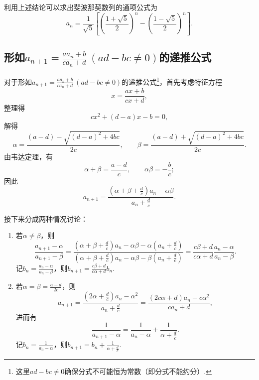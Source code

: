 利用上述结论可以求出斐波那契数列的通项公式为\[
a_n = \frac{1}{\sqrt{5}} \left[
\left(\frac{1+\sqrt{5}}{2}\right)^n
-\left(\frac{1-\sqrt{5}}{2}\right)^n
\right].
\]

\subsection{\texorpdfstring{形如\(a_{n+1} = \frac{a a_n + b}{c a_n + d}\ (ad-bc\neq0)\)的递推公式}{第二类递推公式}}
对于形如\(a_{n+1} = \frac{a a_n + b}{c a_n + d}\ (ad-bc\neq0)\)的递推公式\footnote{这里\(ad-bc\neq0\)确保分式不可能恒为常数（即分式不能约分）.}，首先考虑特征方程\[
x = \frac{ax+b}{cx+d},
\]整理得\[
cx^2+(d-a)x-b=0,
\]解得\[
\alpha=\frac{(a-d)-\sqrt{(d-a)^2+4bc}}{2c}, \qquad
\beta=\frac{(a-d)+\sqrt{(d-a)^2+4bc}}{2c}.
\]由韦达定理，有\[
\alpha+\beta=\frac{a-d}{c}, \qquad
\alpha\beta=-\frac{b}{c};
\]因此\[
a_{n+1} = \frac{\left(\alpha+\beta+\frac{d}{c}\right) a_n - \alpha\beta}{a_n + \frac{d}{c}}.
\]

接下来分成两种情况讨论：\begin{enumerate}
\item 若\(\alpha\neq\beta\)，则\[
\frac{a_{n+1}-\alpha}{a_{n+1}-\beta}
= \frac{\left(\alpha+\beta+\frac{d}{c}\right) a_n - \alpha\beta - \alpha \left(a_n + \frac{d}{c}\right)}{\left(\alpha+\beta+\frac{d}{c}\right) a_n - \alpha\beta - \beta \left(a_n + \frac{d}{c}\right)}
= \frac{c\beta+d}{c\alpha+d} \frac{a_n-\alpha}{a_n-\beta}.
\]记\(b_n = \frac{a_n-\alpha}{a_n-\beta}\)，则\(b_{n+1} = \frac{c\beta+d}{c\alpha+d} b_n\).

\item 若\(\alpha=\beta=\frac{a-d}{2c}\)，则\[
a_{n+1} = \frac{\left(2\alpha+\frac{d}{c}\right) a_n - \alpha^2}{a_n + \frac{d}{c}}
= \frac{(2c\alpha+d)a_n-c\alpha^2}{c a_n+d},
\]进而有\[
\frac{1}{a_{n+1}-\alpha}=\frac{1}{a_n-\alpha}+\frac{1}{\alpha+\frac{d}{c}}.
\]记\(b_n = \frac{1}{a_n-\alpha}\)，则\(b_{n+1} = b_n + \frac{1}{\alpha+\frac{d}{c}}\).
\end{enumerate}
